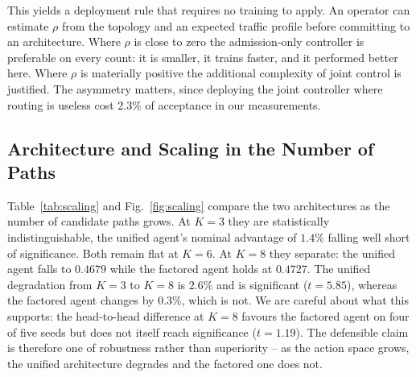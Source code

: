 \documentclass[10pt,journal,comsoc]{IEEEtran}
\begin{document}
This yields a deployment rule that requires no training to apply. An
operator can estimate $\rho$ from the topology and an expected traffic
profile before committing to an architecture. Where $\rho$ is close to
zero the admission-only controller is preferable on every count: it is
smaller, it trains faster, and it performed better here. Where $\rho$ is
materially positive the additional complexity of joint control is
justified. The asymmetry matters, since deploying the joint controller
where routing is useless cost $2.3\%$ of acceptance in our measurements.

\subsection{Architecture and Scaling in the Number of Paths}
\label{sec:scaling}
Table~\ref{tab:scaling} and Fig.~\ref{fig:scaling} compare the two
architectures as the number of candidate paths grows. At $K=3$ they are
statistically indistinguishable, the unified agent's nominal advantage of
$1.4\%$ falling well short of significance. Both remain flat at $K=6$.
At $K=8$ they separate: the unified agent falls to $0.4679$ while the
factored agent holds at $0.4727$. The unified degradation from $K=3$ to
$K=8$ is $2.6\%$ and is significant ($t=5.85$), whereas the factored
agent changes by $0.3\%$, which is not. We are careful about what this
supports: the head-to-head difference at $K=8$ favours the factored agent
on four of five seeds but does not itself reach significance ($t=1.19$).
The defensible claim is therefore one of robustness rather than
superiority -- as the action space grows, the unified architecture
degrades and the factored one does not.
\end{document}
